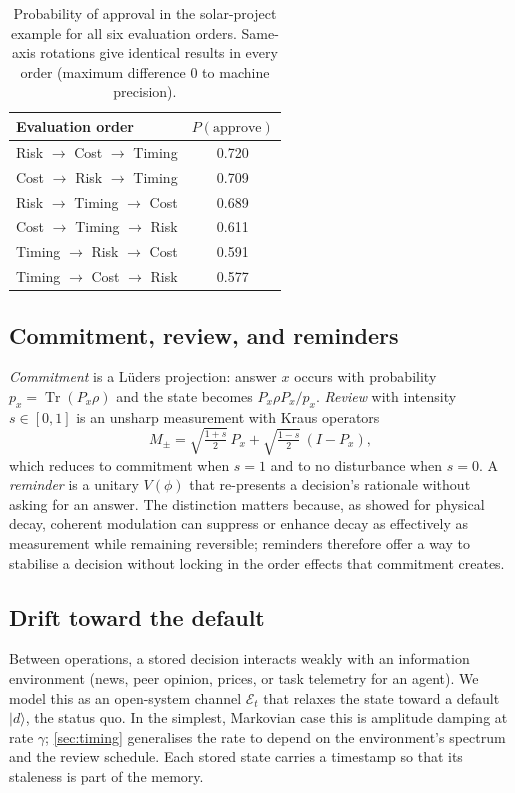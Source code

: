 \documentclass[11pt]{article}
\theoremstyle{definition}
\theoremstyle{remark}
\newcommand{\ket}[1]{\lvert #1\rangle}
\newcommand{\tr}{\operatorname{Tr}}
\begin{document}
\begin{table}[t]
\centering
\caption{Probability of approval in the solar-project example for all six evaluation orders. Same-axis rotations give identical results in every order (maximum difference $0$ to machine precision).}
\label{tab:solar}
\begin{tabular}{lc}
\toprule
Evaluation order & $P(\text{approve})$\\
\midrule
Risk $\to$ Cost $\to$ Timing & 0.720\\
Cost $\to$ Risk $\to$ Timing & 0.709\\
Risk $\to$ Timing $\to$ Cost & 0.689\\
Cost $\to$ Timing $\to$ Risk & 0.611\\
Timing $\to$ Risk $\to$ Cost & 0.591\\
Timing $\to$ Cost $\to$ Risk & 0.577\\
\bottomrule
\end{tabular}
\end{table}

\subsection{Commitment, review, and reminders}
\emph{Commitment} is a L\"uders projection: answer $x$ occurs with probability $p_x=\tr(P_x\rho)$ and the state becomes $P_x\rho P_x/p_x$. \emph{Review} with intensity $s\in[0,1]$ is an unsharp measurement with Kraus operators
\begin{equation}
M_\pm=\sqrt{\tfrac{1+s}{2}}\,P_x+\sqrt{\tfrac{1-s}{2}}\,(I-P_x),
\label{eq:review}
\end{equation}
which reduces to commitment when $s=1$ and to no disturbance when $s=0$. A \emph{reminder} is a unitary $V(\phi)$ that re-presents a decision's rationale without asking for an answer. The distinction matters because, as \citet{kofman2005} showed for physical decay, coherent modulation can suppress or enhance decay as effectively as measurement while remaining reversible; reminders therefore offer a way to stabilise a decision without locking in the order effects that commitment creates.

\subsection{Drift toward the default}
Between operations, a stored decision interacts weakly with an information environment (news, peer opinion, prices, or task telemetry for an agent). We model this as an open-system channel $\mathcal{E}_t$ that relaxes the state toward a default $\ket{d}$, the status quo. In the simplest, Markovian case this is amplitude damping at rate $\gamma$; \cref{sec:timing} generalises the rate to depend on the environment's spectrum and the review schedule. Each stored state carries a timestamp so that its staleness is part of the memory.
\end{document}
